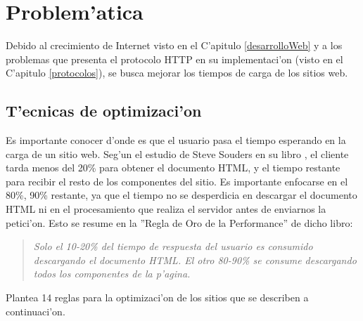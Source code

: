 \chapter{Problem'atica}

Debido al crecimiento de Internet visto en el C'apitulo \ref{desarrolloWeb} y a los problemas que presenta el protocolo HTTP en su implementaci'on (visto en el C'apitulo \ref{protocolos}), se busca mejorar los tiempos de carga de los sitios web. 


\section{T'ecnicas de optimizaci'on}

Es importante conocer d'onde es que el usuario pasa el tiempo esperando en la carga de un sitio web. Seg'un el estudio de Steve Souders en su libro \citep{highPerformanceWebSites}, el cliente tarda menos del 20\% para obtener el documento HTML, y el tiempo restante para recibir el resto de los componentes del sitio. Es importante enfocarse en el 80\%, 90\% restante, ya que el tiempo no se desperdicia en descargar el documento HTML ni en el procesamiento que realiza el servidor antes de enviarnos la petici'on. Esto se resume en la ''Regla de Oro de la Performance'' de dicho libro:

\begin{quote}

\textit{Solo el 10-20\% del tiempo de respuesta del usuario es consumido descargando el documento HTML. El otro 80-90\% se consume descargando todos los componentes de la p'agina.}

\end{quote}

Plantea 14 reglas para la optimizaci'on de los sitios que se describen a continuaci'on.

